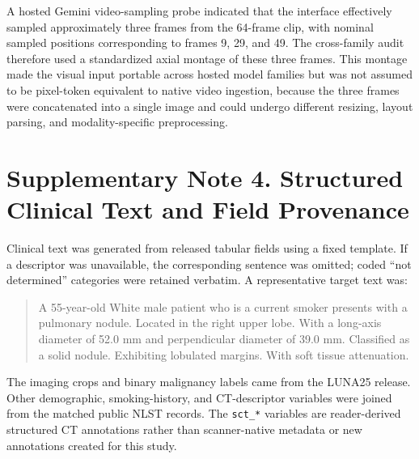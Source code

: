 \documentclass[11pt]{article}
\begin{document}
A hosted Gemini video-sampling probe indicated that the interface effectively
sampled approximately three frames from the 64-frame clip, with nominal sampled
positions corresponding to frames 9, 29, and 49. The cross-family audit
therefore used a standardized axial montage of these three frames. This montage
made the visual input portable across hosted model families but was not assumed
to be pixel-token equivalent to native video ingestion, because the three frames
were concatenated into a single image and could undergo different resizing,
layout parsing, and modality-specific preprocessing.

\section*{Supplementary Note 4. Structured Clinical Text and Field Provenance}

Clinical text was generated from released tabular fields using a fixed template.
If a descriptor was unavailable, the corresponding sentence was omitted; coded
``not determined'' categories were retained verbatim. A representative target
text was:

\begin{quote}
A 55-year-old White male patient who is a current smoker presents with a
pulmonary nodule. Located in the right upper lobe. With a long-axis diameter of
52.0 mm and perpendicular diameter of 39.0 mm. Classified as a solid nodule.
Exhibiting lobulated margins. With soft tissue attenuation.
\end{quote}

The imaging crops and binary malignancy labels came from the LUNA25 release.
Other demographic, smoking-history, and CT-descriptor variables were joined from
the matched public NLST records. The \texttt{sct\_*} variables are
reader-derived structured CT annotations rather than scanner-native metadata or
new annotations created for this study.
\end{document}
